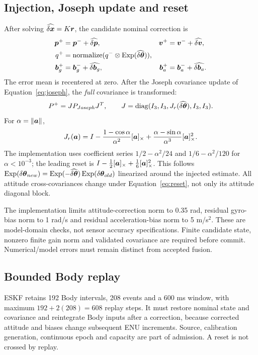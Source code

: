 \subsection{Injection, Joseph update and reset}
After solving $\widehat{\delta\boldsymbol{x}}=K\boldsymbol{r}$, the candidate nominal correction is
\begin{align}
\boldsymbol{p}^+&=\boldsymbol{p}^-+\widehat{\delta\boldsymbol{p}},&
\boldsymbol{v}^+&=\boldsymbol{v}^-+\widehat{\delta\boldsymbol{v}},\\
q^+&=\operatorname{normalize}(q^-\otimes\operatorname{Exp}(\widehat{\delta\boldsymbol{\theta}})),\\
\boldsymbol{b}_g^+&=\boldsymbol{b}_g^-+\widehat{\delta\boldsymbol{b}_g},&
\boldsymbol{b}_a^+&=\boldsymbol{b}_a^-+\widehat{\delta\boldsymbol{b}_a}.
\end{align}
The error mean is recentered at zero. After the Joseph covariance update of Equation~\eqref{eq:joseph}, the \emph{full} covariance is transformed:
\begin{equation}
P^+=J P_{Joseph}J^T,\qquad
J=\operatorname{diag}(I_3,I_3,J_r(\widehat{\delta\boldsymbol{\theta}}),I_3,I_3).
\label{eq:reset}
\end{equation}
For $\alpha=\lVert \boldsymbol{a}\rVert$,
\begin{equation}
J_r(\boldsymbol{a})=I-\frac{1-\cos\alpha}{\alpha^2}[\boldsymbol{a}]_{\times}
+\frac{\alpha-\sin\alpha}{\alpha^3}[\boldsymbol{a}]_{\times}^2.
\end{equation}
The implementation uses coefficient series $1/2-\alpha^2/24$ and $1/6-\alpha^2/120$ for $\alpha<10^{-3}$; the leading reset is
$I-\tfrac12[\boldsymbol{a}]_{\times}+\tfrac16[\boldsymbol{a}]_{\times}^2$.
This follows $\operatorname{Exp}(\delta\boldsymbol{\theta}_{new})=\operatorname{Exp}(-\widehat{\delta\boldsymbol{\theta}})\operatorname{Exp}(\delta\boldsymbol{\theta}_{old})$ linearized around the injected estimate. All attitude cross-covariances change under Equation~\eqref{eq:reset}, not only its attitude diagonal block.

The implementation limits attitude-correction norm to 0.35 rad, residual gyro-bias norm to 1 rad/s and residual acceleration-bias norm to 5 m/s$^2$. These are model-domain checks, not sensor accuracy specifications. Finite candidate state, nonzero finite gain norm and validated covariance are required before commit. Numerical/model errors must remain distinct from accepted fusion.

\subsection{Bounded Body replay}
ESKF retains 192 Body intervals, 208 events and a 600 ms window, with maximum $192+2(208)=608$ replay steps. It must restore nominal state and covariance and reintegrate Body inputs after a correction, because corrected attitude and biases change subsequent ENU increments. Source, calibration generation, continuous epoch and capacity are part of admission. A reset is not crossed by replay.


